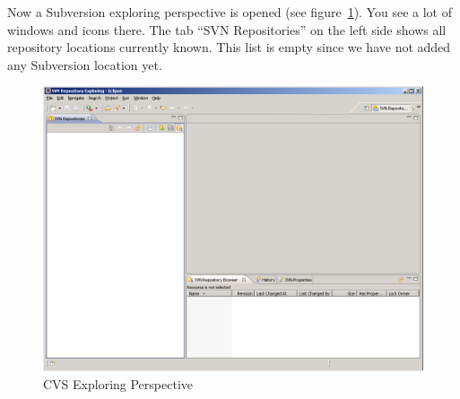 Now a Subversion exploring perspective is opened (see
figure~\ref{fig:eclipse-svn-perspective}). You see a lot of windows
and icons there. The tab ``SVN Repositories'' on the left side shows
all repository locations currently known. This list is empty since we
have not added any Subversion location yet.
\begin{figure}[htbp]
  \centering  \includegraphics[scale=.33]{image/eclipse-svn-perspective}
  \caption{CVS Exploring Perspective}\label{fig:eclipse-svn-perspective}
\end{figure}

